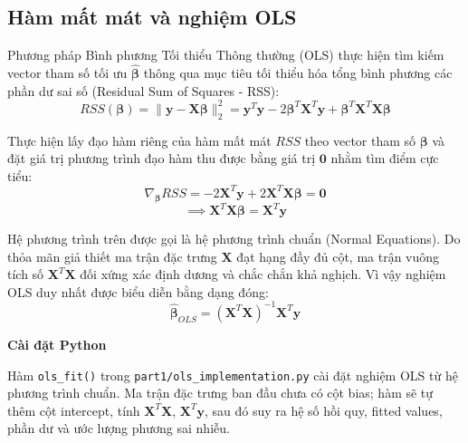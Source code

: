\documentclass[12pt,a4paper]{report}
\begin{document}
\subsection{Hàm mất mát và nghiệm OLS}

Phương pháp Bình phương Tối thiểu Thông thường (OLS) thực hiện tìm kiếm vector tham số tối ưu $\hat{\boldsymbol{\beta}}$ thông qua mục tiêu tối thiểu hóa tổng bình phương các phần dư sai số (Residual Sum of Squares - RSS):
\begin{equation}
    RSS(\boldsymbol{\beta}) = \|\mathbf{y} - \mathbf{X}\boldsymbol{\beta}\|_2^2 = \mathbf{y}^T\mathbf{y} - 2\boldsymbol{\beta}^T\mathbf{X}^T\mathbf{y} + \boldsymbol{\beta}^T\mathbf{X}^T\mathbf{X}\boldsymbol{\beta}
\end{equation}

Thực hiện lấy đạo hàm riêng của hàm mất mát $RSS$ theo vector tham số $\boldsymbol{\beta}$ và đặt giá trị phương trình đạo hàm thu được bằng giá trị $\mathbf{0}$ nhằm tìm điểm cực tiểu:
\begin{equation}
    \nabla_{\boldsymbol{\beta}}RSS = -2\mathbf{X}^T\mathbf{y} + 2\mathbf{X}^T\mathbf{X}\boldsymbol{\beta} = \mathbf{0}
\end{equation}
\begin{equation}
    \implies \mathbf{X}^T\mathbf{X}\boldsymbol{\beta} = \mathbf{X}^T\mathbf{y}
\end{equation}

Hệ phương trình trên được gọi là hệ phương trình chuẩn (Normal Equations). Do thỏa mãn giả thiết ma trận đặc trưng $\mathbf{X}$ đạt hạng đầy đủ cột, ma trận vuông tích số $\mathbf{X}^T\mathbf{X}$ đối xứng xác định dương và chắc chắn khả nghịch. Vì vậy nghiệm OLS duy nhất được biểu diễn bằng dạng đóng:
\begin{equation}
    \hat{\boldsymbol{\beta}}_{OLS} = (\mathbf{X}^T\mathbf{X})^{-1}\mathbf{X}^T\mathbf{y}
\end{equation}

\textbf{Cài đặt Python}

Hàm \texttt{ols\_fit()} trong \texttt{part1/ols\_implementation.py} cài đặt nghiệm OLS từ hệ phương trình chuẩn. Ma trận đặc trưng ban đầu chưa có cột bias; hàm sẽ tự thêm cột intercept, tính $\mathbf{X}^T\mathbf{X}$, $\mathbf{X}^T\mathbf{y}$, sau đó suy ra hệ số hồi quy, fitted values, phần dư và ước lượng phương sai nhiễu.
\end{document}

